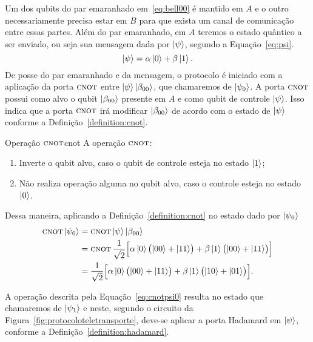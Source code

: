 Um dos qubits do par emaranhado em~\eqref{eq:bell00} é mantido em \(A\) e o outro necessariamente precisa estar em \(B\) para que exista um canal de comunicação entre essas partes. Além do par emaranhado, em \(A\) teremos o estado quântico a ser enviado, ou seja sua mensagem dada por $\ket{\psi}$, segundo a Equação~\eqref{eq:psi}.
 \begin{equation}\label{psi}
  \ket{\psi} = \alpha \ket{0} + \beta \ket{1}.
 \end{equation}
De posse do par emaranhado e da mensagem, o protocolo é iniciado com a aplicação da porta \(\operatorname{\textsc{cnot}}\) entre $\ket{\psi}\ket{\beta_{00}}$, que chamaremos de $\ket{\psi_0}$. A porta \(\operatorname{\textsc{cnot}}\) possui como alvo o qubit $\ket{\beta_{00}}$ presente em \(A\) e como qubit de controle $\ket{\psi}$. Isso indica que a porta \(\operatorname{\textsc{cnot}}\) irá modificar $\ket{\beta_{00}}$ de acordo com o estado de $\ket{\psi}$ conforme a Definição~\ref{definition:cnot}.

\begin{definition}{Operação \(\operatorname{\textsc{cnot}}\)}{cnot}
  A operação \(\operatorname{\textsc{cnot}}\):
  \begin{enumerate}[label=\roman*.,left=0pt]
    \item Inverte o qubit alvo, caso o qubit de controle esteja no estado $\ket{1}$;
    \item Não realiza operação alguma no qubit alvo, caso o controle esteja no estado $\ket{0}$.
  \end{enumerate}
\end{definition}

Dessa maneira, aplicando a Definição~\ref{definition:cnot} no estado dado por $\ket{\psi_0}$
\begin{align}\label{eq:cnotpsi0}
  \operatorname{\textsc{cnot}} \ket{\psi_0} &= \operatorname{\textsc{cnot}} \ket{\psi} \ket{\beta_{00}} \nonumber \\
                     &= \operatorname{\textsc{cnot}} \frac{1}{\sqrt{2}} \Bigl[ \alpha \ket{0} \bigl( \ket{00} + \ket{11} \bigr) + \beta \ket{1} \bigl( \ket{00} + \ket{11} \bigr)\Bigr] \nonumber \\
                     &= \frac{1}{\sqrt{2}} \Bigl[\alpha \ket{0} \bigl( \ket{00} + \ket{11} \bigr) + \beta \ket{1} \bigl( \ket{10} + \ket{01} \bigr) \Bigr].
\end{align}

A operação descrita pela Equação~\eqref{eq:cnotpsi0} resulta no estado que chamaremos de $\ket{\psi_1}$ e neste, segundo o circuito da Figura~\ref{fig:protocoloteletransporte}, deve-se aplicar a porta Hadamard em $\ket{\psi}$, conforme a Definição~\ref{definition:hadamard}.


